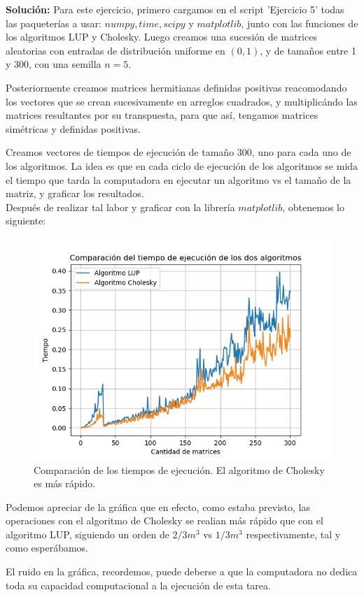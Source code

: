 \documentclass[letterpaper]{article}
\newcommand{\1}{\mathds{1}}
\theoremstyle{definition}
\theoremstyle{definition}
\theoremstyle{definition}
\theoremstyle{definition}
\theoremstyle{definition}
\begin{document}
\begin{enumerate}
    \textbf{Solución:} Para este ejercicio, primero cargamos en el script 'Ejercicio 5' todas las paqueterías
     a usar: $numpy, time, scipy$ y $matplotlib$, junto con las funciones de los algoritmos LUP y Cholesky. 
    Luego creamos una sucesión de matrices aleatorias con entradas
    de distribución uniforme en $(0,1)$, y de tamaños entre 1 y 300, con una semilla $n=5$.
    \newline

    Posteriormente creamos matrices hermitianas definidas positivas reacomodando los vectores
    que se crean sucesivamente en arreglos cuadrados, y multiplicándo las matrices resultantes por
    su transpuesta, para que así, tengamos matrices simétricas y definidas positivas.
    \newline

    Creamos vectores de tiempos de ejecución de tamaño 300, uno para cada uno de los algoritmos.
    La idea es que en cada ciclo de ejecución de los algoritmos se mida el tiempo que
    tarda la computadora en ejecutar un algoritmo vs el tamaño de la matriz, y graficar los resultados.
    \\

    Después de realizar tal labor y graficar con la librería $matplotlib$, obtenemos lo siguiente:

    \begin{figure}[h]
        \centering
        \includegraphics[width=0.5\linewidth]{e.png}
        \caption[Figura 5]{Comparación de los tiempos de ejecución. El algoritmo de Cholesky es más rápido.}
    \end{figure}
    Podemos apreciar de la gráfica que en efecto, como estaba previsto, las operaciones con el algoritmo
    de Cholesky se realian más rápido que con el algoritmo LUP, siguiendo un orden de $2/3m^3$ vs $1/3m^3$
    respectivamente, tal y como esperábamos.
    \newline
    
    El ruido en la gráfica, recordemos, puede deberse a que la computadora no dedica toda su capacidad
    computacional a la ejecución de esta tarea.

\end{enumerate}
\end{document}
